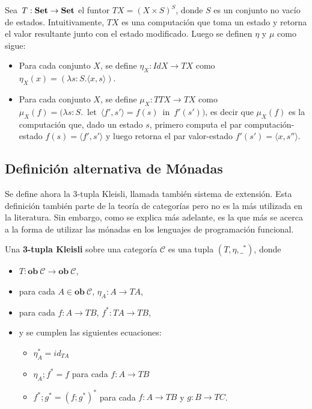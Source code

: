 \begin{ejemplo}
Sea $\mathit{T} : \text{\bf Set} \rightarrow \text{\bf Set}$ el funtor $\mathit{T} X = (X \times S)^S$, donde $S$ es un conjunto no vacío de estados. Intuitivamente, $\mathit{T} X$ es una computación que toma un estado y retorna el valor resultante junto con el estado modificado. Luego se definen $\eta$ y $\mu$ como sigue:
\begin{itemize}[noitemsep, label=$\blacktriangleright$]
	\item Para cada conjunto $X$, se define $\eta_X : \mathit{Id} X \rightarrow \mathit{T} X$ como $\eta_X (x) = (\lambda s : S . \langle x , s \rangle)$.
	\item Para cada conjunto $X$, se define $\mu_X : \mathit{T T} X \rightarrow \mathit{T} X$ como \\ \mbox{$\mu_X (f) = (\lambda s : S .$ let $\langle f' , s' \rangle = f(s)$ in $f'(s'))$}, es decir que $\mu_X (f)$ es la computación que, dado un estado $s$, primero computa el par computación-estado $f(s) = \langle f' , s' \rangle$ y luego retorna el par valor-estado $f'(s') = \langle x , s'' \rangle$.   
\end{itemize}
\end{ejemplo}

\subsection{Definición alternativa de Mónadas}\label{monadas:alt}

Se define ahora la 3-tupla Kleisli, llamada también sistema de extensión. Esta definición también parte de la teoría de categorías pero no es la más utilizada en la literatura. Sin embargo, como se explica más adelante, es la que más se acerca a la forma de utilizar las mónadas en los lenguajes de programación funcional. 

\begin{definition}
Una \textbf{3-tupla Kleisli} sobre una categoría $\mathscr{C}$ es una tupla $(\mathit{T},\eta,\_^*)$, donde 
\begin{itemize}[noitemsep,label=$\blacktriangleright$]
	\item $\mathit{T} : \mathbf{ob} \ \mathscr{C} \rightarrow \mathbf{ob} \ \mathscr{C}$,
	\item para cada $A \in \mathbf{ob} \ \mathscr{C}$, $\eta_A : A \rightarrow \mathit{T}A$,
	\item para cada $f : A \rightarrow \mathit{T}B$,  $f^* : \mathit{T}A \rightarrow \mathit{T}B$,
	\item y se cumplen las siguientes ecuaciones:
	\begin{itemize}[noitemsep,label=$\bullet$]
		\item $\eta^*_A = id_{\mathit{T}A}$
		\item $\eta_A ; f^* = f$ para cada $f : A \rightarrow \mathit{T}B$
		\item $f^* ; g^* = (f ; g^*)^*$ para cada $f : A \rightarrow \mathit{T}B$ y $g : B \rightarrow \mathit{T}C$.
	\end{itemize}
\end{itemize}
\end{definition}


